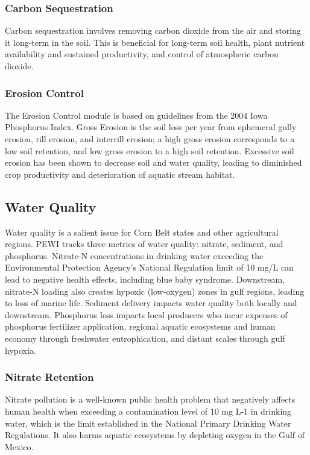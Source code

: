 \documentclass[11pt]{article}
\begin{document}
\subsubsection{Carbon Sequestration}
Carbon sequestration involves removing carbon dioxide from the air and storing it long-term in the soil. This is beneficial for long-term soil health, plant nutrient availability and sustained productivity, and control of atmospheric carbon dioxide. 
 
\cleardoublepage
\newpage

\subsubsection{Erosion Control}
The Erosion Control module is based on guidelines from the 2004 Iowa Phosphorus Index. Gross Erosion is the soil loss per year from ephemeral gully erosion, rill erosion, and interrill erosion; a high gross erosion corresponds to a low soil retention, and low gross erosion to a high soil retention. Excessive soil erosion has been shown to decrease soil and water quality, leading to diminished crop productivity and deterioration of aquatic stream habitat.\cite{36}

\subsection{Water Quality}
Water quality is a salient issue for Corn Belt states and other agricultural regions. PEWI tracks three metrics of water quality: nitrate, sediment, and phosphorus. Nitrate-N concentrations in drinking water exceeding the Environmental Protection Agency’s National Regulation limit of 10 mg/L can lead to negative health effects, including blue baby syndrome.\cite{37}  Downstream, nitrate-N loading also creates hypoxic (low-oxygen) zones in gulf regions, leading to loss of marine life.\cite{38}  Sediment delivery impacts water quality both locally and downstream.\cite{39} Phosphorus loss impacts local producers who incur expenses of phosphorus fertilizer application, regional aquatic ecosystems and human economy through freshwater eutrophication, and distant scales through gulf hypoxia.\cite{40} 

\subsubsection{Nitrate Retention}
Nitrate pollution is a well-known public health problem that negatively affects human health when exceeding a contamination level of 10 mg L-1 in drinking water, which is the limit established in the National Primary Drinking Water Regulations.  It also harms aquatic ecosystems by depleting oxygen in the Gulf of Mexico.\cite{41}
\end{document}
